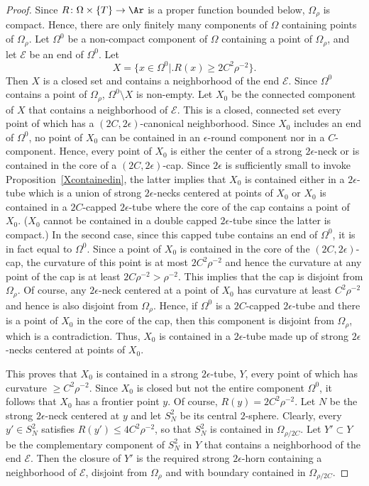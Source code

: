 \begin{proof}
Since $R\colon \Omega\times\{T\}\to \Ar$ is a proper function
bounded below, $\Omega_\rho$ is compact. Hence, there are only
finitely many components of $\Omega$ containing points of
$\Omega_\rho$. Let $\Omega^0$ be a non-compact component of $\Omega$
containing a point of $\Omega_\rho$, and let ${\mathcal E}$ be an
end of $\Omega^0$. Let
$$X=\{x\in \Omega^0\bigl|\bigr.
R(x)\ge 2C^2\rho^{-2}\}.$$ Then $X$ is a closed set and contains a
neighborhood of the end ${\mathcal E}$. Since $\Omega^0$ contains a
point of $\Omega_\rho$, $\Omega^0\setminus X$ is non-empty. Let
$X_0$ be the connected component of $X$ that contains a neighborhood
of ${\mathcal E}$. This is a closed, connected set every point of
which has  a $(2C,2\epsilon)$-canonical neighborhood. Since $X_0$
includes an end of $\Omega^0$, no point of $X_0$ can be contained in
an $\epsilon$-round component nor in a $C$-component. Hence, every
point of $X_0$ is either the center of a strong $2\epsilon$-neck or
is contained in the core of a $(2C,2\epsilon)$-cap. Since
$2\epsilon$ is sufficiently small to invoke
Proposition~\ref{Xcontainedin}, the latter implies that $X_0$ is
contained either in a $2\epsilon$-tube which is a union of strong
$2\epsilon$-necks centered at points of $X_0$ or $X_0$ is contained
in a $2C$-capped $2\epsilon$-tube where the core of the cap contains
a point of $X_0$. ($X_0$ cannot be contained in a double capped
$2\epsilon$-tube since the latter is compact.) In the second case,
since this capped tube contains an end of $\Omega^0$, it is in fact
equal to $\Omega^0$. Since a point of $X_0$ is contained in the core
of the $(2C,2\epsilon)$-cap, the curvature of this point is at most
$2C^2\rho^{-2}$ and hence the curvature at any point of the cap is
at least $2C\rho^{-2}>\rho^{-2}$. This implies that the cap is
disjoint from $\Omega_{\rho}$. Of course, any $2\epsilon$-neck
centered at a point of $X_0$ has curvature at least $C^2\rho^{-2}$
and hence is also disjoint from $\Omega_\rho$. Hence, if $\Omega^0$
is a $2C$-capped $2\epsilon$-tube and there is a point of $X_0$ in
the core of the cap, then this component is disjoint from
$\Omega_\rho$, which is a contradiction. Thus,  $X_0$ is contained
in a $2\epsilon$-tube made up of strong $2\epsilon$-necks centered
at points of $X_0$.



This proves that $X_0$ is contained in a strong $2\epsilon$-tube,
$Y$, every point of which has curvature $\ge C^2\rho^{-2}$. Since
$X_0$ is closed but not the entire component $\Omega^0$, it follows
that $X_0$ has a frontier point $y$. Of course,
$R(y)=2C^2\rho^{-2}$. Let $N$ be the strong $2\epsilon$-neck
centered at $y$ and let $S_N^2$ be its central $2$-sphere. Clearly,
every $y'\in S^2_N$ satisfies $R(y')\le 4C^2\rho^{-2}$, so that
$S^2_N$ is contained in $\Omega_{\rho/2C}$. Let $Y'\subset Y$ be the
complementary component of $S^2_N$ in $Y$ that contains a
neighborhood of the end ${\mathcal E}$. Then the closure of $Y'$ is
the required strong $2\epsilon$-horn containing a neighborhood of
${\mathcal E}$, disjoint from $\Omega_\rho$ and with boundary
contained in $\Omega_{\rho/2C}$.



\end{proof}
